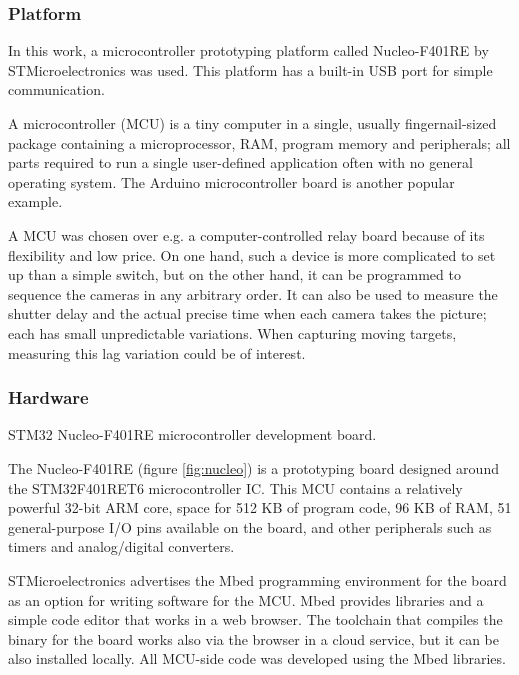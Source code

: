 \subsubsection{Platform}

In this work, a microcontroller prototyping platform called Nucleo-F401RE by STMicroelectronics was used.
This platform has a built-in USB port for simple communication.

A microcontroller (MCU) is a tiny computer in a single, usually fingernail-sized package containing a microprocessor, RAM, program memory and peripherals; all parts required to run a single user-defined application often with no general operating system.
The Arduino microcontroller board is another popular example.

A MCU was chosen over e.g. a computer-controlled relay board because of its flexibility and low price.
On one hand, such a device is more complicated to set up than a simple switch, but on the other hand, it can be programmed to sequence the cameras in any arbitrary order.
It can also be used to measure the shutter delay and the actual precise time when each camera takes the picture; each has small unpredictable variations.
When capturing moving targets, measuring this lag variation could be of interest.

\subsubsection{Hardware}

{STM32 Nucleo-F401RE microcontroller development board.}

The Nucleo-F401RE (figure \ref{fig:nucleo}) is a prototyping board designed around the STM32F401RET6 microcontroller IC.
This MCU contains a relatively powerful 32-bit ARM core, space for 512 KB of program code, 96 KB of RAM, 51 general-purpose I/O pins available on the board, and other peripherals such as timers and analog/digital converters.

STMicroelectronics advertises the Mbed programming environment for the board as an option for writing software for the MCU.
Mbed provides libraries and a simple code editor that works in a web browser.
The toolchain that compiles the binary for the board works also via the browser in a cloud service, but it can be also installed locally.
All MCU-side code was developed using the Mbed libraries.

